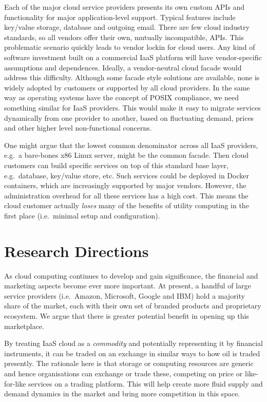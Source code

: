 \documentclass[conference,10pt]{IEEEtran}
\begin{document}
Each of the major cloud service providers presents its own custom APIs and functionality for major application-level support. Typical features include key/value storage, database and outgoing email.
There are few cloud industry standards, so all vendors offer their own, mutually incompatible, APIs.
This problematic scenario quickly leads to vendor lockin for cloud users. Any kind of software investment built on a commercial IaaS platform will have vendor-specific assumptions and dependences. 
Ideally, a vendor-neutral cloud facade would address this difficulty. Although some facade style solutions are available, none is widely adopted by customers or supported by all cloud providers.
In the same way as operating systems have the concept of POSIX compliance, we need something similar for IaaS providers. This would make it easy to migrate services dynamically from one provider to another, based on fluctuating demand, prices and other higher level non-functional concerns.

One might argue that the lowest common denominator across all IaaS providers, e.g.\ a bare-bones x86 Linux server, might be the common facade. Then cloud customers can build specific services on top of this standard base layer, e.g.\ database, key/value store, etc. Such services could be deployed in Docker containers, which are increasingly supported by major vendors. However, the administration overhead for all these services has a high cost.
This means the cloud customer actually \emph{loses} many of the benefits of utility computing in the first place
(i.e.\ minimal setup and configuration).


\section{Research Directions}
\label{sec-directions}

As cloud computing continues to develop and gain significance, the financial and marketing aspects become ever more important.
At present, a handful of large service providers (i.e.\ Amazon, Microsoft, Google and IBM) hold a majority share of the market, each with their own set of branded products and proprietary ecosystem. We argue that there is greater potential benefit in opening up this marketplace.

By treating IaaS cloud as a \emph{commodity} and potentially representing it by financial instruments, it can be traded on an exchange in similar ways to how oil is traded presently. The rationale here is that storage or computing resources are generic and hence organisations can exchange or trade these, competing on price or like-for-like services on a trading platform. This will help create more fluid supply and demand dynamics in the market and bring more competition in this space.
\end{document}
